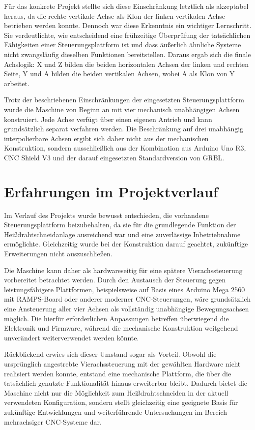 Für das konkrete Projekt stellte sich diese Einschränkung letztlich als akzeptabel heraus, da die rechte vertikale Achse als Klon der linken vertikalen Achse betrieben werden konnte. Dennoch war diese Erkenntnis ein wichtiger Lernschritt. Sie verdeutlichte, wie entscheidend eine frühzeitige Überprüfung der tatsächlichen Fähigkeiten einer Steuerungsplattform ist und dass äußerlich ähnliche Systeme nicht zwangsläufig dieselben Funktionen bereitstellen. Daraus ergab sich die finale Achslogik: X und Z bilden die beiden horizontalen Achsen der linken und rechten Seite, Y und A bilden die beiden vertikalen Achsen, wobei A als Klon von Y arbeitet.

Trotz der beschriebenen Einschränkungen der eingesetzten Steuerungsplattform wurde die Maschine von Beginn an mit vier mechanisch unabhängigen Achsen konstruiert. Jede Achse verfügt über einen eigenen Antrieb und kann grundsätzlich separat verfahren werden. Die Beschränkung auf drei unabhängig interpolierbare Achsen ergibt sich daher nicht aus der mechanischen Konstruktion, sondern ausschließlich aus der Kombination aus Arduino Uno R3, CNC Shield V3 und der darauf eingesetzten Standardversion von GRBL.

\section{Erfahrungen im Projektverlauf}

Im Verlauf des Projekts wurde bewusst entschieden, die vorhandene Steuerungsplattform beizubehalten, da sie für die grundlegende Funktion der Heißdrahtschneidanlage ausreichend war und eine zuverlässige Inbetriebnahme ermöglichte. Gleichzeitig wurde bei der Konstruktion darauf geachtet, zukünftige Erweiterungen nicht auszuschließen.

Die Maschine kann daher als hardwareseitig für eine spätere Vierachssteuerung vorbereitet betrachtet werden. Durch den Austausch der Steuerung gegen leistungsfähigere Plattformen, beispielsweise auf Basis eines Arduino Mega 2560 mit RAMPS-Board oder anderer moderner CNC-Steuerungen, wäre grundsätzlich eine Ansteuerung aller vier Achsen als vollständig unabhängige Bewegungsachsen möglich. Die hierfür erforderlichen Anpassungen betreffen überwiegend die Elektronik und Firmware, während die mechanische Konstruktion weitgehend unverändert weiterverwendet werden könnte.

Rückblickend erwies sich dieser Umstand sogar als Vorteil. Obwohl die ursprünglich angestrebte Vierachssteuerung mit der gewählten Hardware nicht realisiert werden konnte, entstand eine mechanische Plattform, die über die tatsächlich genutzte Funktionalität hinaus erweiterbar bleibt. Dadurch bietet die Maschine nicht nur die Möglichkeit zum Heißdrahtschneiden in der aktuell verwendeten Konfiguration, sondern stellt gleichzeitig eine geeignete Basis für zukünftige Entwicklungen und weiterführende Untersuchungen im Bereich mehrachsiger CNC-Systeme dar.

